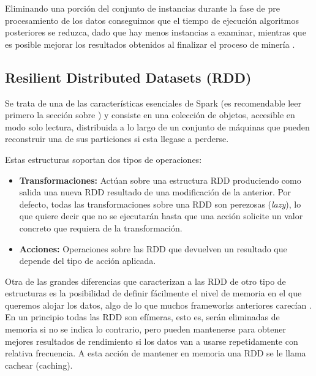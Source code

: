 Eliminando una porción del conjunto de instancias durante la fase de pre procesamiento de los datos conseguimos que el tiempo de ejecución algoritmos posteriores se reduzca, dado que hay menos instancias a examinar, mientras que es posible mejorar los resultados obtenidos al finalizar el proceso de minería \cite{IntroInstanceSelect}.


\subsection{Resilient Distributed Datasets (RDD)}\label{sec:DefRDD}

Se trata de una de las características esenciales de Spark (es recomendable leer primero la sección sobre ) y consiste en una colección de objetos, accesible en modo solo lectura, distribuida a lo largo de un conjunto de máquinas que pueden reconstruir una de sus particiones si esta llegase a perderse. \cite{SparkPaper}


Estas estructuras soportan dos tipos de operaciones:

\begin{itemize}
	\item \textbf{Transformaciones:} Actúan sobre una estructura RDD produciendo como salida una nueva RDD resultado de una modificación de la anterior. Por defecto, todas las transformaciones sobre una RDD son perezosas (\textit{lazy}), lo que quiere decir que no se ejecutarán hasta que una acción solicite un valor concreto que requiera de la transformación. \cite{SparkPaper}
	\item \textbf{Acciones:} Operaciones sobre las RDD que devuelven un resultado que depende del tipo de acción aplicada.
\end{itemize}

Otra de las grandes diferencias que caracterizan a las RDD de otro tipo de estructuras es la posibilidad de definir fácilmente el nivel de memoria en el que queremos alojar los datos, algo de lo que muchos frameworks anteriores carecían \cite{RDDPaper}. En un principio todas las RDD son efímeras, esto es, serán eliminadas de memoria si no se indica lo contrario, pero pueden mantenerse para obtener mejores resultados de rendimiento si los datos van a usarse repetidamente con relativa frecuencia. A esta acción de mantener en memoria una RDD se le llama cachear (caching).


